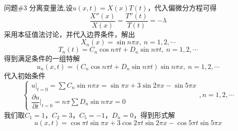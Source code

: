 \documentclass[12pt]{ctexart}
\begin{document}
    \begin{problem}{问题\#3}
        分离变量法,设$u(x,t)=X(x)T(t)$，代入偏微分方程可得
        $$
        \dfrac{X''(x)}{X(x)}=\dfrac{T''(t)}{T(t)}=-\lambda
        $$
        采用本征值法讨论，并代入边界条件，解出
        $$
        X_n(x)=\sin n\pi x,\ n=1,2,\cdots
        $$
        $$
        T_n(t)=C_n\cos n\pi t+D_n\sin n\pi t,\ n=1,2,\cdots
        $$
        得到满足条件的一组特解
        $$
        u_n(x,t)=(C_n\cos n\pi t+D_n\sin n\pi t)\sin n\pi x,\ n=1,2,\cdots
        $$
        代入初始条件
        $$
        \begin{cases}
            u|_{t=0}=\sum C_n\sin n\pi x=\sin\pi x+3\sin2\pi x-\sin5\pi x\\
            \dfrac{\partial u}{\partial t}|_{t=0}=n\pi\sum D_n\sin n\pi x=0
        \end{cases}
        ,n=1,2,\cdots
        $$
        我们取$C_1=1$，$C_2=3$，$C_5=-1$，$D_n=0$，得到形式解
        $$
        u(x,t)=\cos\pi t\sin\pi x+3\cos2\pi t\sin2\pi x-\cos5\pi t\sin5\pi x
        $$
    \end{problem}
\end{document}
